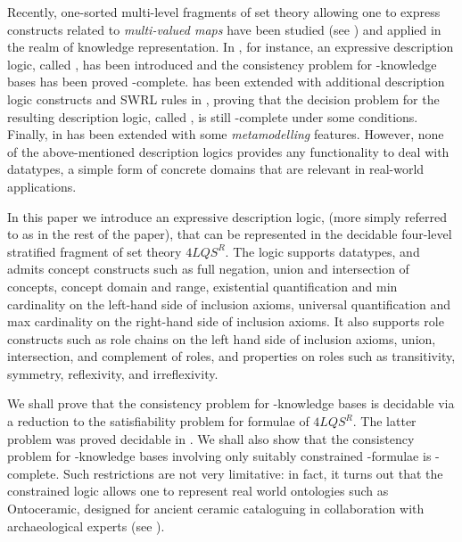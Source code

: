 \documentclass[a4paper]{llncs}
\newcommand{\flqsr}{\ensuremath{4LQS^R}}
\begin{document}
\newcommand{\mlsscart}{\ensuremath{\mathsf{MLSS}_{2,m}^{\times}}}
\newcommand{\dlmlsscart}{\ensuremath{\mathcal{DL\langle}\mathsf{MLSS}_{2,m}^{\times}\mathcal{\rangle}}}
\newcommand{\dlForallpizerotwo}{\ensuremath{\mathcal{DL\langle}\Forallpizerotwo\mathcal{\rangle}}}
\newcommand{\Forallpizerotwo}{\ensuremath{\mathbf{\forall_{0,2}^{\pi}}}}


Recently, one-sorted multi-level fragments of set theory allowing one to express constructs related to \emph{multi-valued maps} have been studied (see \cite{CanLonNic2010, CanLonNic11, CanLon2014}) and applied in the realm of knowledge representation. In \cite{CanLonPis2010}, for instance, an expressive description logic, called , has been introduced and the consistency problem for -knowledge bases has been proved -complete.  has been extended with additional description logic constructs and SWRL rules in \cite{CanLonNic11}, proving that the decision problem for the resulting description logic, called , is still -complete under some conditions. Finally, in \cite{CanLon2014}  has been extended with some \emph{metamodelling} features.
However, none of the above-mentioned description logics provides any functionality to deal with
datatypes, a simple form of concrete domains that are relevant in real-world applications.





In this paper we introduce an expressive description logic,  (more simply referred to as  in the rest of the paper), that can be represented in the decidable four-level stratified fragment of set theory \flqsr. The logic  supports da\-ta\-ty\-pes, and admits concept constructs such as full negation, union and intersection of concepts, concept domain and range, existential quantification and min cardinality on the left-hand side of inclusion axioms, universal quantification and max cardinality on the right-hand side of inclusion axioms. It also supports role constructs such as role chains on the left hand side of inclusion axioms, union, intersection, and complement of roles, and properties on roles such as transitivity, symmetry, reflexivity, and irreflexivity.

We shall prove that the consistency problem for -knowledge bases is decidable via a reduction to the satisfiability problem for formulae of \flqsr. The latter problem was proved decidable in \cite{CanNic2013}.  We shall also show that the consistency problem for -knowledge bases involving only suitably constrained -formulae is -complete. Such restrictions are not very limitative: in fact, it turns out that the constrained logic allows one to represent real world ontologies such as \textsf{Ontoceramic}, designed for ancient ceramic cataloguing in collaboration with archaeological experts (see \cite{caa2015:ontoceramic,santaLAP}).
\end{document}
